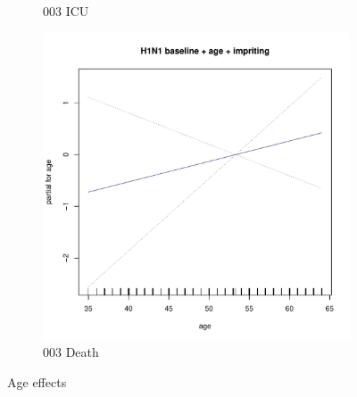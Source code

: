 \documentclass[12pt,twoside]{article}
\begin{document}
\begin{figure}[h]
\begin{subfigure}{.3\linewidth}
                \caption{003 ICU}
        \end{subfigure}
        \begin{subfigure}{.3\linewidth}
                \includegraphics[width=\textwidth, page=1]{003Death_constrained}
                \caption{003 Death}
        \end{subfigure}
        \caption{Age effects}
        \end{figure}



    
    
    
    
\end{document}
